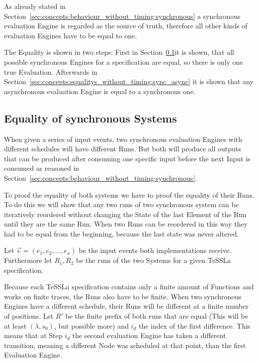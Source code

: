 As already stated in Section~\ref{sec:concepts:behaviour_without_timing:synchronous} a synchronous evaluation Engine is regarded as the source of truth, therefore all other kinds of evaluation Engines have to be equal to one.

The Equality is shown in two steps: First in Section~\ref{sec:concepts:equalitys_without_timing:synchronous}it is shown, that all possible synchronous Engines for a specification are equal, so there is only one true Evaluation.
Afterwards in Section~\ref{sec:concepts:equalitys_without_timing:sync_async} it is shown that any asynchronous evaluation Engine is equal to a synchronous one.

\subsection{Equality of synchronous Systems}
\label{sec:concepts:equalitys_without_timing:synchronous}

When given a series of input events, two synchronous evaluation Engines with different schedules will have different Runs.
But both will produce all outputs that can be produced after consuming one specific input before the next Input is consumed as reasoned in Section~\ref{sec:concepts:behaviour_without_timing:synchronous}.

To proof the equality of both systems we have to proof the equality of their Runs.
To do this we will show that any two runs of two synchronous system can be iteratively reordered without changing the State of the last Element of the Run until they are the same Run.
When two Runs can be reordered in this way they had to be equal from the beginning, because the last state was never altered.

Let \(\vec{e} = (e_1, e_2, \dots, e_x)\) be the input events both implementations receive.
Furthermore let \(R_1, R_2\) be the runs of the two Systems for a given TeSSLa specification.

Because each TeSSLa specification contains only a finite amount of Functions and works on finite traces, the Runs also have to be finite.
When two synchronous Engines have a different schedule, their Runs will be different at a finite number of positions.
Let \(R'\) be the finite prefix of both runs that are equal (This will be at least \((\lambda, s_0)\), but possible more) and \(i_d\) the index of the first difference.
This means that at Step \(i_d\) the second evaluation Engine has taken a different transition, meaning a different Node was scheduled at that point, than the first Evaluation Engine.

